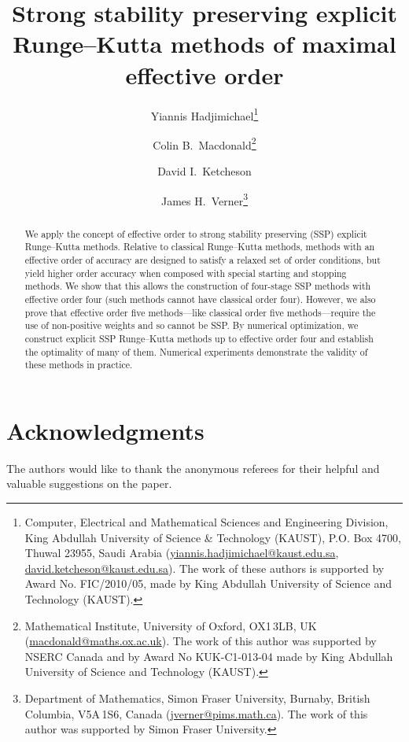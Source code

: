 \documentclass[10pt,a4paper,oneside]{article}
\title{Strong stability preserving explicit Runge--Kutta methods of maximal effective order
}
\author{
        Yiannis Hadjimichael\thanks{Computer, Electrical and Mathematical Sciences and 
        Engineering Division, King Abdullah University of Science \& Technology (KAUST), 
        P.O. Box 4700, Thuwal 23955, Saudi Arabia
        (\url{yiannis.hadjimichael@kaust.edu.sa}, 
        \url{david.ketcheson@kaust.edu.sa}).
        The work of these authors is supported by Award No. FIC/2010/05, made by King 
        Abdullah University of Science and Technology (KAUST).}
        \and 
        Colin B.~Macdonald\thanks{Mathematical Institute, University of Oxford, OX1\,3LB, UK 
        (\url{macdonald@maths.ox.ac.uk}).
        The work of this author was supported by NSERC 
        Canada and by Award No KUK-C1-013-04 made by King Abdullah University of Science 
        and Technology (KAUST).}
        \and 
        David I.~Ketcheson\footnotemark[1]
        \and 
        James H.~Verner\thanks{Department of Mathematics, Simon Fraser University,
        Burnaby, British Columbia, V5A\,1S6, Canada
        (\url{jverner@pims.math.ca}).
        The work of this author was supported by Simon Fraser University.}
}
\begin{document}
        \maketitle
        
        \begin{abstract}
                We apply the concept of effective order to strong stability preserving 
                (SSP) explicit Runge--Kutta methods.
                Relative to classical Runge--Kutta methods, methods with an effective order of accuracy
                are designed to satisfy a relaxed set of order conditions, but yield higher 
                order accuracy  when composed with special starting and stopping methods. 
         We show that this allows the construction of four-stage SSP methods with 
         effective order four (such methods cannot have classical order four). 
         However, we also prove that effective order five methods---like classical
         order five methods---require the use of non-positive weights and so cannot
         be SSP.
         By numerical optimization, we construct explicit SSP Runge--Kutta methods 
         up to effective order four and establish the optimality of many of them.
                Numerical experiments demonstrate the validity of these methods in
                practice.
        \end{abstract}
		
%
%
		
        
        
        
        
        
        
        

        \section*{Acknowledgments}{
                The authors would like to thank the anonymous referees for their helpful 
                and valuable suggestions on the paper.
        }

        
\end{document}

